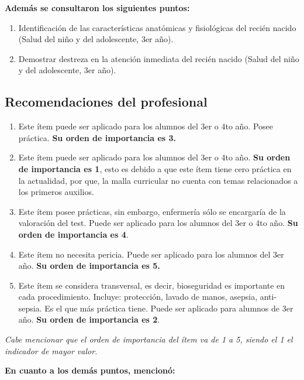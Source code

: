 \textbf{Además se consultaron los siguientes puntos:}

\begin{enumerate}
\def\labelenumi{\arabic{enumi}.}
\itemsep1pt\parskip0pt
\item
  Identificación de las características anatómicas y fisiológicas del
  recién nacido (Salud del niño y del adolescente, 3er año).
\item
  Demostrar destreza en la atención inmediata del recién nacido (Salud
  del niño y del adolescente, 3er año).
\end{enumerate}

\subsection{Recomendaciones del
profesional}

\begin{enumerate}
\def\labelenumi{\arabic{enumi}.}
\itemsep1pt\parskip0pt
\item
  Este ítem puede ser aplicado para los alumnos del 3er o 4to año. Posee
  práctica. \textbf{Su orden de importancia es 3.}
\item
  Este ítem puede ser aplicado para los alumnos del 3er o 4to año.
  \textbf{Su orden de importancia es 1}, esto es debido a que este ítem
  tiene cero práctica en la actualidad, por que, la malla curricular no
  cuenta con temas relacionados a los primeros auxilios.
\item
  Este ítem posee prácticas, sin embargo, enfermería sólo se encargaría
  de la valoración del test. Puede ser aplicado para los alumnos del 3er
  o 4to año. \textbf{Su orden de importancia es 4}.
\item
  Este ítem no necesita pericia. Puede ser aplicado para los alumnos del
  3er año. \textbf{Su orden de importancia es 5.}
\item
  Este ítem se considera transversal, es decir, bioseguridad es
  importante en cada procedimiento. Incluye: protección, lavado de
  manos, asepsia, anti-sepsia. Es el que más práctica tiene. Puede ser
  aplicado para alumnos de 3er año. \textbf{Su orden de importancia es
  2}.
\end{enumerate}

\emph{Cabe mencionar que el orden de importancia del ítem va de 1 a 5,
siendo el 1 el indicador de mayor valor.}

\textbf{En cuanto a los demás puntos, mencionó:}

